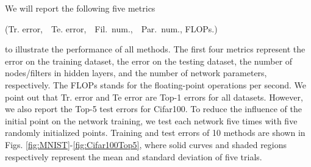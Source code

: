 \documentclass[journal]{IEEEtran}
\begin{document}
We will report the following five metrics
\begin{center}
(Tr. error,~~Te. error,~~Fil.~num.,~~Par.~num., FLOPs.)
\end{center}
to illustrate the performance of all methods. The first four metrics represent the error on the training dataset, the error on the testing dataset, the number of nodes/filters in hidden layers, and the number of network parameters, respectively. The FLOPs stands for the floating-point operations per second. { We point out that Tr. error and Te error are  Top-1 errors for all datasets. However, we also report the Top-5 test errors for Cifar100. To reduce the influence of the initial point on the network training, we test each network five times with five randomly initialized points. Training and test errors of 10 methods are shown in  Figs. \ref{fig:MNIST}-\ref{fig:Cifar100Top5}, where solid curves and shaded regions respectively represent the mean and standard deviation of five trials.}
\end{document}
